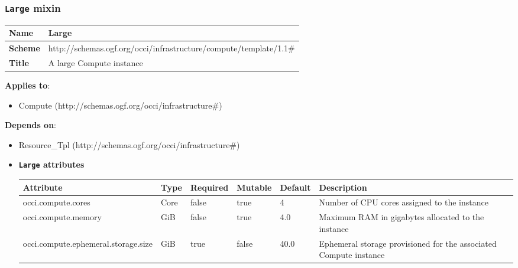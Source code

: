 \subsubsection{\texttt{Large} mixin}
\begin{center}
\begin{tabular}{|l|l|}
  \hline
  \textbf{Name} & Large \\
  \hline  
  \textbf{Scheme} & http://schemas.ogf.org/occi/infrastructure/compute/template/1.1\# \\
  \hline
  \textbf{Title} & A large Compute instance \\
  \hline
\end{tabular}
\end{center}
\textbf{Applies to}:
\begin{itemize}
	\item Compute (http://schemas.ogf.org/occi/infrastructure\#)
\end{itemize}
\textbf{Depends on}:
\begin{itemize}
	\item Resource\_Tpl (http://schemas.ogf.org/occi/infrastructure\#)
\end{itemize}

\begin{itemize}
\item \textbf{\texttt{Large} attributes}

\begin{tabularx}{\textwidth}{|l|l|p{1.4cm}|p{1.3cm}|l|X|}
  \hline
  \textbf{Attribute} & \textbf{Type} & \textbf{Required} & \textbf{Mutable} & \textbf{Default} & \textbf{Description} \\
  \hline  
  occi.compute.cores & Core & false & true & 4 & Number of CPU cores assigned to the instance \\
  \hline
  occi.compute.memory & GiB & false & true & 4.0 & Maximum RAM in gigabytes allocated to the instance \\
  \hline
  occi.compute.ephemeral.storage.size & GiB & true & false & 40.0 & Ephemeral storage provisioned for the associated Compute instance \\
  \hline
\end{tabularx}
\end{itemize}


